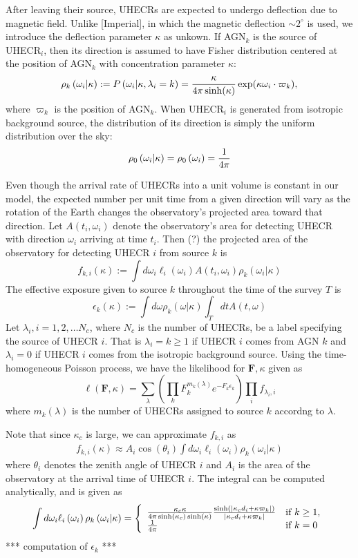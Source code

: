 \documentclass[dvips,aoas]{imsart}
\newcommand{\be}{\begin{equation}}
\newcommand{\ee}{\end{equation}}
\newcommand{\ba}{\begin{eqnarray}}
\newcommand{\ea}{\end{eqnarray}}
\begin{document}
After leaving their source, UHECRs are expected to undergo deflection due to magnetic field.
Unlike [Imperial], in which the magnetic deflection $\sim 2^\circ$ is used,
we introduce the deflection parameter $\kappa$ as unkown. If AGN$_k$ is the source of UHECR$_i$,
then its direction is assumed to have Fisher distribution centered at the position of AGN$_k$
with concentration parameter $\kappa$:
\be
\rho_k\left(\omega_i|\kappa\right) := P\left(\omega_i|\kappa,\lambda_i=k\right) = {\kappa\over 4\pi\sinh(\kappa)}\exp(\kappa\omega_i\cdot\varpi_k),
\ee
where $\varpi_k$ is the position of AGN$_k$.
When UHECR$_i$ is generated from isotropic background source, the distribution of its
direction is simply the uniform distribution over the sky:
\be
\rho_0\left(\omega_i|\kappa\right) = \rho_0\left(\omega_i\right) = {1\over4\pi}
\ee

Even though the arrival rate of UHECRs into a unit volume is constant in our model, the expected
number per unit time from a given direction will vary as the rotation of the Earth changes
the observatory's projected area toward that direction. Let $A(t_i,\omega_i)$ denote
the observatory's area for detecting UHECR with direction $\omega_i$ arriving at time $t_i$.
Then (?) the projected area of the observatory for detecting UHECR $i$ from source $k$ is
\be
f_{k,i}(\kappa) := \int d\omega_i \ell_i\left(\omega_i\right) A\left(t_i,\omega_i\right) \rho_k(\omega_i|\kappa)
\ee
The effective exposure given to source $k$ throughout the time of the survey $T$ is
\be
\epsilon_k(\kappa) := \int d\omega \rho_k\left(\omega|\kappa\right)\int_Tdt A(t,\omega)
\ee
Let $\lambda_i, i = 1,2,\ldots N_c$, where $N_c$ is the number of UHECRs, be a label specifying
the source of UHECR $i$. That is $\lambda_i = k \geq 1$ if UHECR $i$ comes from AGN $k$ and
$\lambda_i = 0$ if UHECR $i$ comes from the isotropic background source. Using the time-homogeneous
Poisson process, we have the likelihood for $\boldsymbol{F},\kappa$ given as
\be
\ell(\boldsymbol{F},\kappa)=\sum_{\lambda}\left(\prod_k F_k^{m_k(\lambda)}e^{-F_k\epsilon_k}\right) \prod_i f_{\lambda_i,i}
\ee
where $m_k(\lambda)$ is the number of UHECRs assigned to source $k$ accordng to $\lambda$.

Note that since $\kappa_c$ is large, we can approximate $f_{k,i}$ as
\ba
f_{k,i}(\kappa) \approx A_i\cos(\theta_i)\int d\omega_i \ell_i\left(\omega_i\right)\rho_k\left(\omega_i|\kappa\right)
\ea
where $\theta_i$ denotes the zenith angle of UHECR $i$ and $A_i$ is the area of the observatory at the
arrival time of UHECR $i$. The integral can be computed analytically, and is given as
\ba
\int d\omega_i \ell_i\left(\omega_i\right)\rho_k\left(\omega_i|\kappa\right) =
\left\{
\begin{array}{ll}
{\kappa_c\kappa \over 4\pi\sinh(\kappa_c)\sinh(\kappa)}{\sinh(|\kappa_c d_i+\kappa\varpi_k|)\over|\kappa_c d_i+\kappa\varpi_k|} & \mbox{if $k\geq 1$},\\
{1\over 4\pi} & \mbox{if $k=0$}
\end{array}
\right.
\ea
*** computation of $\epsilon_k$ ***
\end{document}
